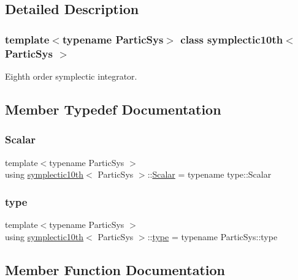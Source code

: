 \subsection{Detailed Description}
\subsubsection*{template$<$typename Partic\+Sys$>$\newline
class symplectic10th$<$ Partic\+Sys $>$}

Eighth order symplectic integrator. 

\subsection{Member Typedef Documentation}
\mbox{\label{classsymplectic10th_a700bbf7a6116e27ac7c6bfd0cc3018bc}} 
\subsubsection{\texorpdfstring{Scalar}{Scalar}}
{\footnotesize\ttfamily template$<$typename Partic\+Sys $>$ \\
using \mbox{\hyperlink{classsymplectic10th}{symplectic10th}}$<$ Partic\+Sys $>$\+::\mbox{\hyperlink{classsymplectic10th_a700bbf7a6116e27ac7c6bfd0cc3018bc}{Scalar}} =  typename type\+::\+Scalar}

\mbox{\label{classsymplectic10th_a4fe3f3c6f8e672f40426f52512e083a5}} 
\subsubsection{\texorpdfstring{type}{type}}
{\footnotesize\ttfamily template$<$typename Partic\+Sys $>$ \\
using \mbox{\hyperlink{classsymplectic10th}{symplectic10th}}$<$ Partic\+Sys $>$\+::\mbox{\hyperlink{classsymplectic10th_a4fe3f3c6f8e672f40426f52512e083a5}{type}} =  typename Partic\+Sys\+::type}



\subsection{Member Function Documentation}
\mbox{\label{classsymplectic10th_aaa762c854968f135a0a6b01c908c7636}} 
